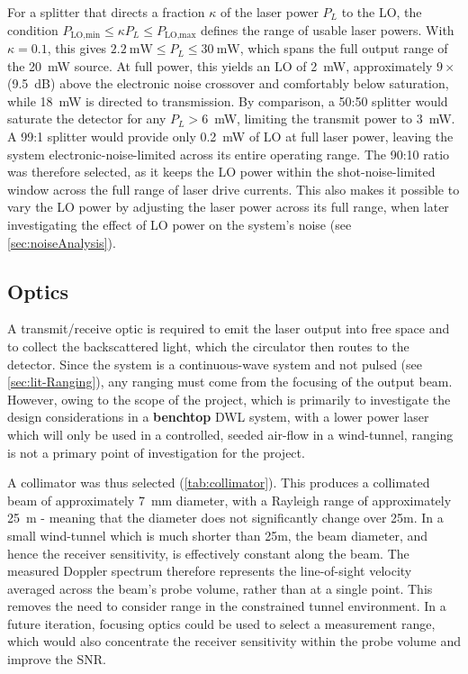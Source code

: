  For a splitter that directs a fraction $\kappa$ of the laser power $P_L$ to the
 LO, the condition $P_{\text{LO,min}} \leq \kappa P_L \leq P_{\text{LO,max}}$ defines
 the range of usable laser powers. With $\kappa = 0.1$, this gives
 $2.2~\text{mW} \leq P_L \leq 30~\text{mW}$, which spans the full output range of
 the 20~mW source. At full power, this yields an LO of 2~mW, approximately
 $9\times$ (9.5~dB) above the electronic noise crossover and comfortably below
 saturation, while 18~mW is directed to transmission. By comparison, a 50:50
 splitter would saturate the detector for any $P_L > 6$~mW, limiting the transmit
 power to 3~mW. A 99:1 splitter would provide only 0.2~mW of LO at full laser
 power, leaving the system electronic-noise-limited across its entire operating
 range. The 90:10 ratio was therefore selected, as it keeps the LO power within
 the shot-noise-limited window across the full range of laser drive currents. This also makes it possible to vary the LO power by adjusting the laser power across its full range, when later investigating the effect of LO power on the  system's noise (see \autoref{sec:noiseAnalysis}). 
 
 \subsection{Optics}
 A transmit/receive optic is required to emit the laser output into free space and to collect the backscattered light, which the circulator then routes to the detector. Since the system is a continuous-wave system and not pulsed (see \autoref{sec:lit-Ranging}), any ranging must come from the focusing of the output beam. However, owing to the scope of the project, which is primarily to investigate the design considerations in a \textbf{benchtop} DWL system, with a lower power laser which will only be used in a controlled, seeded air-flow in a wind-tunnel, ranging is not a primary point of investigation for the project. 
 
 A collimator was thus selected (\autoref{tab:collimator}). This produces a
 collimated beam of approximately 7~mm diameter, with a Rayleigh range of
 approximately 25~m - meaning that the diameter does not significantly change over 25m. In a small wind-tunnel which is much shorter than 25m, the beam diameter, and hence the
 receiver sensitivity, is effectively constant along the beam. The measured
 Doppler spectrum therefore represents the line-of-sight velocity averaged across the beam's probe volume, rather than at a single point. This removes the need to consider range in the constrained tunnel
 environment. In a future iteration, focusing optics could be used to select a
 measurement range, which would also concentrate the receiver sensitivity within
 the probe volume and improve the SNR.
 
